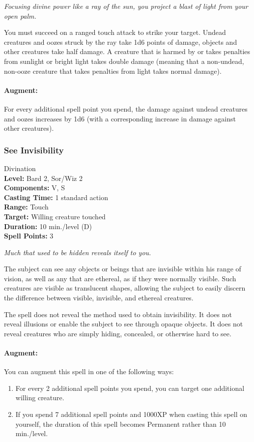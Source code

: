 \emph{Focusing divine power like a ray of the sun, you project a blast of light from your open palm. }

You must succeed on a ranged touch attack to strike your target.
Undead creatures and oozes struck by the ray take 1d6 points of damage, objects and other creatures take half damage.
A creature that is harmed by or takes penalties from sunlight or bright light takes double damage (meaning that a non-undead, non-ooze creature that takes penalties from light takes normal damage).

\paragraph{Augment:} For every additional spell point you spend, the damage against undead creatures and oozes increases by 1d6 (with a corresponding increase in damage against other creatures).
\subsubsection{See Invisibility}
\label{Spell:SeeInvisibility}
Divination
\\ \textbf{Level:} Bard 2, Sor/Wiz 2
\\ \textbf{Components:} V, S
\\ \textbf{Casting Time:} 1 standard action
\\ \textbf{Range:} Touch
\\ \textbf{Target:} Willing creature touched
\\ \textbf{Duration:} 10 min./level (D)
\\ \textbf{Spell Points:} 3

\emph{Much that used to be hidden reveals itself to you.}

The subject can see any objects or beings that are invisible within his range of vision, as well as any that are ethereal, as if they were normally visible. 
Such creatures are visible as translucent shapes, allowing the subject to easily discern the difference between visible, invisible, and ethereal creatures.

The spell does not reveal the method used to obtain invisibility. 
It does not reveal illusions or enable the subject to see through opaque objects. 
It does not reveal creatures who are simply hiding, concealed, or otherwise hard to see.

\paragraph{Augment:} You can augment this spell in one of the following ways:
\begin{enumerate}
 \item For every 2 additional spell points you spend, you can target one additional willing creature.
 \item If you spend 7 additional spell points and 1000XP when casting this spell on yourself, the duration of this spell becomes Permanent rather than 10 min./level.
\end{enumerate}
